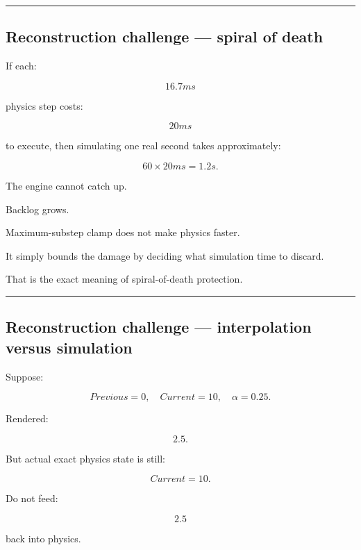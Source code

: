 \begin{center}\rule{0.5\linewidth}{0.5pt}\end{center}

\subsection{Reconstruction challenge --- spiral of death}\label{06-engine-ii-ch038-reconstruction-challenge-spiral-of-death}

\hypertarget{06-engine-ii-ch038-reconstruction-challenge-spiral-of-death}{}

If each:

\[
16.7ms
\]

physics step costs:

\[
20ms
\]

to execute, then simulating one real second takes approximately:

\[
60\times20ms=1.2s.
\]

The engine cannot catch up.

Backlog grows.

Maximum-substep clamp does not make physics faster.

It simply bounds the damage by deciding what simulation time to discard.

That is the exact meaning of spiral-of-death protection.

\begin{center}\rule{0.5\linewidth}{0.5pt}\end{center}

\subsection{Reconstruction challenge --- interpolation versus simulation}\label{06-engine-ii-ch038-reconstruction-challenge-interpolation-versus-simulation}

\hypertarget{06-engine-ii-ch038-reconstruction-challenge-interpolation-versus-simulation}{}

Suppose:

\[
Previous=0,
\quad
Current=10,
\quad
\alpha=0.25.
\]

Rendered:

\[
2.5.
\]

But actual exact physics state is still:

\[
Current=10.
\]

Do not feed:

\[
2.5
\]

back into physics.

